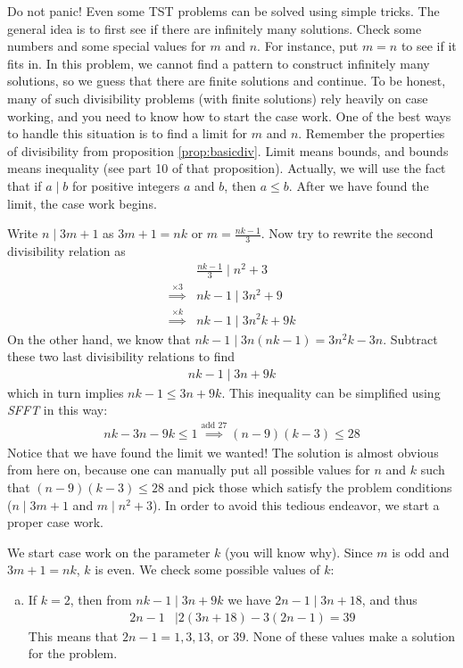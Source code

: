 \documentclass{subfile}
\begin{document}
	\begin{solution}
		Do not panic! Even some TST problems can be solved using simple tricks. The general idea is to first see if there are infinitely many solutions. Check some numbers and some special values for $m$ and $n$. For instance, put $m=n$ to see if it fits in. In this problem, we cannot find a pattern to construct infinitely many solutions, so we guess that there are finite solutions and continue. To be honest, many of such divisibility problems (with finite solutions) rely heavily on case working, and you need to know how to start the case work. One of the best ways to handle this situation is to find a limit for $m$ and $n$. Remember the properties of divisibility from proposition \eqref{prop:basicdiv}. Limit means bounds, and bounds means inequality (see part 10 of that proposition). Actually, we will use the fact that if $a\mid b$ for positive integers $a$ and $b$, then $a \leq b$. After we have found the limit, the case work begins.

		Write $n\mid 3m+1$ as $3m+1=nk$ or $m=\frac{nk-1}{3}$. Now try to rewrite the second divisibility relation as
			\begin{align*}
				& \frac{nk-1}{3} \mid n^2 + 3 \\
				\stackrel{\times 3}{\implies} & nk-1\mid 3n^2+9 \\
				\stackrel{\times k}{\implies} & nk-1\mid 3n^2k+9k
			\end{align*}
		On the other hand, we know that $nk-1\mid 3n(nk-1)=3n^2k-3n$. Subtract these two last divisibility relations to find
			\begin{align*}
				nk-1 \mid 3n+9k
			\end{align*}
		which in turn implies $nk-1 \leq 3n+9k$. This inequality can be simplified using \textit{SFFT} in this way:
			\begin{align*}
				nk-3n-9k\leq 1 \stackrel{\text{add }27}{\implies} (n-9)(k-3) \leq 28
			\end{align*}
		Notice that we have found the limit we wanted! The solution is almost obvious from here on, because one can manually put all possible values for $n$ and $k$ such that $(n-9)(k-3) \leq 28$ and pick those which satisfy the problem conditions ($n\mid 3m+1$ and $m\mid n^2+3$). In order to avoid this tedious endeavor, we start a proper case work.

		We start case work on the parameter $k$ (you will know why). Since $m$ is odd and $3m+1=nk$, $k$ is even. We check some possible values of $k$:
			\begin{enumerate}[(a)]
				\item If $k=2$, then from $nk-1\mid 3n+9k$ we have $2n-1\mid 3n+18$, and thus
					\begin{align*}
						2n-1
							& \mid 2(3n+18)-3(2n-1)=39
					\end{align*}
				 This means that $2n-1=1, 3, 13$, or $39$. None of these values make a solution for the problem.


\end{enumerate}
\end{solution}
\end{document}
